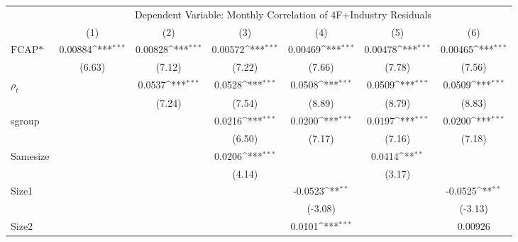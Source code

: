 {
\def\sym#1{\ifmmode^{#1}\else\(^{#1}\)\fi}
\begin{tabular}{l*{6}{c}}
\hline\hline
 & \multicolumn{6}{c}{Dependent Variable: Monthly Correlation of 4F+Industry Residuals}                 \\
 \cline{2-7}
                    &\multicolumn{1}{c}{(1)}         &\multicolumn{1}{c}{(2)}         &\multicolumn{1}{c}{(3)}         &\multicolumn{1}{c}{(4)}         &\multicolumn{1}{c}{(5)}         &\multicolumn{1}{c}{(6)}         \\
\hline
$ \text{FCAP*} $    &     0.00884\sym{***}&     0.00828\sym{***}&     0.00572\sym{***}&     0.00469\sym{***}&     0.00478\sym{***}&     0.00465\sym{***}\\
                    &      (6.63)         &      (7.12)         &      (7.22)         &      (7.66)         &      (7.78)         &      (7.56)         \\
[1em]
 $ \rho_t $         &                     &      0.0537\sym{***}&      0.0528\sym{***}&      0.0508\sym{***}&      0.0509\sym{***}&      0.0509\sym{***}\\
                    &                     &      (7.24)         &      (7.54)         &      (8.89)         &      (8.79)         &      (8.83)         \\
[1em]
sgroup              &                     &                     &      0.0216\sym{***}&      0.0200\sym{***}&      0.0197\sym{***}&      0.0200\sym{***}\\
                    &                     &                     &      (6.50)         &      (7.17)         &      (7.16)         &      (7.18)         \\
[1em]
Samesize            &                     &                     &      0.0206\sym{***}&                     &      0.0414\sym{**} &                     \\
                    &                     &                     &      (4.14)         &                     &      (3.17)         &                     \\
[1em]
Size1               &                     &                     &                     &     -0.0523\sym{**} &                     &     -0.0525\sym{**} \\
                    &                     &                     &                     &     (-3.08)         &                     &     (-3.13)         \\
[1em]
Size2               &                     &                     &                     &      0.0101\sym{***}&                     &     0.00926         \\

\end{tabular}}
